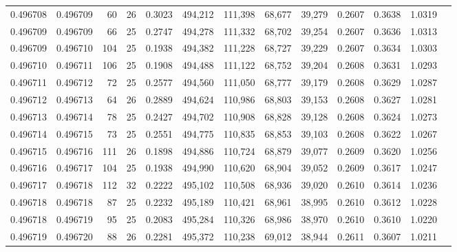 \begin{tabular}{rrrrrrrrrrrrr}
0.496708 & 0.496709 &  60 &  26 &                                     0.3023 & 494,212 & 111,398 &  68,677 &  39,279 & 0.2607 & 0.3638 & 1.0319 \\
0.496709 & 0.496709 &  66 &  25 &                                     0.2747 & 494,278 & 111,332 &  68,702 &  39,254 & 0.2607 & 0.3636 & 1.0313 \\
0.496709 & 0.496710 & 104 &  25 &                                     0.1938 & 494,382 & 111,228 &  68,727 &  39,229 & 0.2607 & 0.3634 & 1.0303 \\
0.496710 & 0.496711 & 106 &  25 &                                     0.1908 & 494,488 & 111,122 &  68,752 &  39,204 & 0.2608 & 0.3631 & 1.0293 \\
0.496711 & 0.496712 &  72 &  25 &                                     0.2577 & 494,560 & 111,050 &  68,777 &  39,179 & 0.2608 & 0.3629 & 1.0287 \\
0.496712 & 0.496713 &  64 &  26 &                                     0.2889 & 494,624 & 110,986 &  68,803 &  39,153 & 0.2608 & 0.3627 & 1.0281 \\
0.496713 & 0.496714 &  78 &  25 &                                     0.2427 & 494,702 & 110,908 &  68,828 &  39,128 & 0.2608 & 0.3624 & 1.0273 \\
0.496714 & 0.496715 &  73 &  25 &                                     0.2551 & 494,775 & 110,835 &  68,853 &  39,103 & 0.2608 & 0.3622 & 1.0267 \\
0.496715 & 0.496716 & 111 &  26 &                                     0.1898 & 494,886 & 110,724 &  68,879 &  39,077 & 0.2609 & 0.3620 & 1.0256 \\
0.496716 & 0.496717 & 104 &  25 &                                     0.1938 & 494,990 & 110,620 &  68,904 &  39,052 & 0.2609 & 0.3617 & 1.0247 \\
0.496717 & 0.496718 & 112 &  32 &                                     0.2222 & 495,102 & 110,508 &  68,936 &  39,020 & 0.2610 & 0.3614 & 1.0236 \\
0.496718 & 0.496718 &  87 &  25 &                                     0.2232 & 495,189 & 110,421 &  68,961 &  38,995 & 0.2610 & 0.3612 & 1.0228 \\
0.496718 & 0.496719 &  95 &  25 &                                     0.2083 & 495,284 & 110,326 &  68,986 &  38,970 & 0.2610 & 0.3610 & 1.0220 \\
0.496719 & 0.496720 &  88 &  26 &                                     0.2281 & 495,372 & 110,238 &  69,012 &  38,944 & 0.2611 & 0.3607 & 1.0211 \\

\end{tabular}
